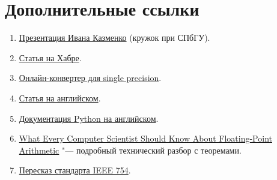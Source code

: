 \section{Дополнительные ссылки}

\begin{frame}
	\begin{enumerate}
		\item \href{http://acm.math.spbu.ru/~gassa/slides/number-representation.ru.pdf}{Презентация Ивана Казменко} (кружок при СПбГУ).
		\item \href{https://habrahabr.ru/post/112953/}{Статья на Хабре}.
		\item \href{https://www.h-schmidt.net/FloatConverter/IEEE754.html}{Онлайн-конвертер для single precision}.
		\item \href{http://steve.hollasch.net/cgindex/coding/ieeefloat.html}{Статья на английском}.
		\item \href{https://docs.python.org/3/tutorial/floatingpoint.html}{Документация Python на английском}.
		\item \href{https://docs.oracle.com/cd/E19957-01/806-3568/ncg_goldberg.html}{What Every Computer Scientist Should Know About Floating-Point Arithmetic} "--- подробный технический разбор с теоремами.
		\item \href{http://www.softelectro.ru/ieee754.html}{Пересказ стандарта IEEE 754}.
	\end{enumerate}
\end{frame}
